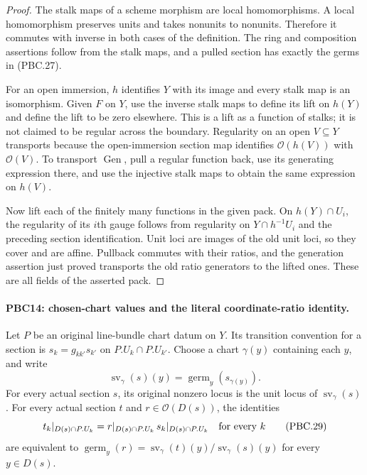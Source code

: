 \documentclass[11pt,a4paper]{article}
\numberwithin{equation}{section}
\theoremstyle{remark}\newtheorem{remark}[theorem]{Remark}
\begin{document}
\begin{proof}
The stalk maps of a scheme morphism are local homomorphisms.
A local homomorphism preserves units and takes nonunits to nonunits.
Therefore it commutes with inverse in both cases of the definition.
The ring and composition assertions follow from the stalk maps,
and a pulled section has exactly the germs in (PBC.27).

For an open immersion, $h$ identifies $Y$ with its image and
every stalk map is an isomorphism.  Given $F$ on $Y$, use the
inverse stalk maps to define its lift on $h(Y)$ and define the
lift to be zero elsewhere.  This is a lift as a function of
stalks; it is not claimed to be regular across the boundary.
Regularity on an open $V\subseteq Y$ transports because the
open-immersion section map identifies $\mathcal O(h(V))$ with
$\mathcal O(V)$.  To transport $\operatorname{Gen}$, pull a
regular function back, use its generating expression there, and
use the injective stalk maps to obtain the same expression on
$h(V)$.

Now lift each of the finitely many functions in the given pack.
On $h(Y)\cap U_i$, the regularity of its $i$th gauge follows
from regularity on $Y\cap h^{-1}U_i$ and the preceding section
identification.  Unit loci are images of the old unit loci,
so they cover and are affine.  Pullback commutes with their
ratios, and the generation assertion just proved transports
the old ratio generators to the lifted ones.  These are all
fields of the asserted pack.
\end{proof}

\paragraph{PBC14: chosen-chart values and the literal coordinate-ratio identity.}
\label{claim:PBC14}
Let $P$ be an original line-bundle chart datum on $Y$.
Its transition convention for a section is
$s_k=g_{kk'}s_{k'}$ on $P.U_k\cap P.U_{k'}$.
Choose a chart $\gamma(y)$ containing each $y$, and write
\[
 \operatorname{sv}_\gamma(s)(y)
       =\operatorname{germ}_y(s_{\gamma(y)}).
                                                        \tag{PBC.28}
\]
For every actual section $s$, its original nonzero locus is the
unit locus of $\operatorname{sv}_\gamma(s)$.  For every actual
section $t$ and $r\in\mathcal O(D(s))$, the identities
\[
 t_k|_{D(s)\cap P.U_k}
   =r|_{D(s)\cap P.U_k}\,s_k|_{D(s)\cap P.U_k}
       \quad\hbox{for every }k
                                                        \tag{PBC.29}
\]
are equivalent to
$\operatorname{germ}_y(r)=
\operatorname{sv}_\gamma(t)(y)/
\operatorname{sv}_\gamma(s)(y)$ for every $y\in D(s)$.
\end{document}
